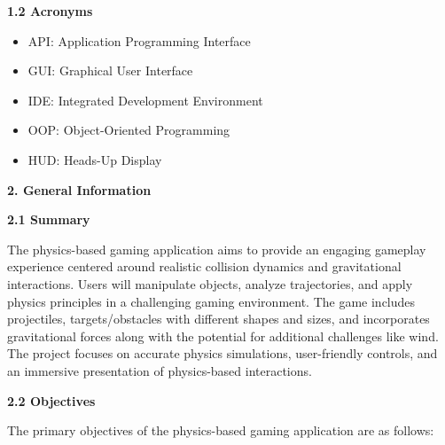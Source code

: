 \documentclass[
]{article}
\begin{document}
\protect\hypertarget{A3}{}{}\textbf{1.2 Acronyms}

\begin{itemize}
\item
  API: Application Programming Interface
\item
  GUI: Graphical User Interface
\item
  IDE: Integrated Development Environment
\item
  OOP: Object-Oriented Programming
\item
  HUD: Heads-Up Display
\end{itemize}

\protect\hypertarget{Aa2}{}{}\textbf{2. General Information}

\protect\hypertarget{Aa3}{}{}\textbf{2.1 Summary}

The physics-based gaming application aims to provide an engaging
gameplay experience centered around realistic collision dynamics and
gravitational interactions. Users will manipulate objects, analyze
trajectories, and apply physics principles in a challenging gaming
environment. The game includes projectiles, targets/obstacles with
different shapes and sizes, and incorporates gravitational forces along
with the potential for additional challenges like wind. The project
focuses on accurate physics simulations, user-friendly controls, and an
immersive presentation of physics-based interactions.

\protect\hypertarget{Aa4}{}{}\textbf{2.2 Objectives}

The primary objectives of the physics-based gaming application are as
follows:
\end{document}
